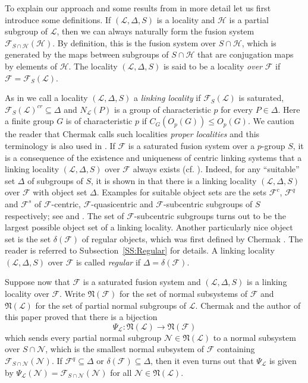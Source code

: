 \documentclass[reqno,11pt]{amsart}
\numberwithin{equation}{section}
\theoremstyle{definition}
\newcommand{\F}{\mathcal{F}}
\renewcommand{\L}{\mathcal{L}}
\newcommand{\N}{\mathcal{N}}
\renewcommand{\H}{\mathcal{H}}
\newcommand{\fN}{\mathfrak{N}}
\begin{document}
\smallskip

To explain our approach and some results from \cite{Chermak/Henke} in more detail let us first introduce some definitions. If $(\L,\Delta,S)$ is a locality and $\H$ is a partial subgroup of $\L$, then we can always naturally form the fusion system $\F_{S\cap\H}(\H)$. By definition, this is the fusion system over $S\cap\H$, which is generated by the maps between subgroups of $S\cap\H$ that are conjugation maps by elements of $\H$. The locality $(\L,\Delta,S)$ is said to be a locality \emph{over} $\F$ if $\F=\F_S(\L)$. 

\smallskip

As in \cite{Henke:2015} we call a locality $(\L,\Delta,S)$  a \emph{linking locality} if $\F_S(\L)$ is saturated, $\F_S(\L)^{cr}\subseteq\Delta$ and $N_\L(P)$ is a group of characteristic $p$ for every $P\in\Delta$. Here a finite group $G$ is of characteristic $p$ if $C_G(O_p(G))\leq O_p(G)$. We caution the reader that Chermak \cite{ChermakII,ChermakIII} calls such localities \emph{proper localities} and this terminology is also used in \cite{Chermak/Henke}. If $\F$ is a saturated fusion system over a $p$-group $S$, it is a consequence of the existence and uniqueness of centric linking systems that a linking locality $(\L,\Delta,S)$ over $\F$ always exists (cf. \cite{Chermak:2013,Oliver:2013,Glauberman/Lynd}). Indeed, for any ``suitable'' set $\Delta$  of subgroups of $S$, it is shown in \cite[Theorem~A]{Henke:2015} that there is a linking locality $(\L,\Delta,S)$ over $\F$ with object set $\Delta$. Examples for suitable object sets are the sets $\F^c$, $\F^q$ and $\F^s$ of $\F$-centric, $\F$-quasicentric and $\F$-subcentric subgroups of $S$ respectively; see \cite[Definition~I.3.1, Definition~III.4.5]{Aschbacher/Kessar/Oliver:2011} and \cite[Definition~1]{Henke:2015}. The set of $\F$-subcentric subgroups turns out to be the largest possible object set of a linking locality. Another particularly nice object set is the set $\delta(\F)$ of regular objects, which was first defined by Chermak \cite[p.36]{ChermakIII}. The reader is referred to Subsection~\ref{SS:Regular} for details. A linking locality $(\L,\Delta,S)$ over $\F$ is called \emph{regular} if $\Delta=\delta(\F)$.

\smallskip

Suppose now that $\F$ is a saturated fusion system and $(\L,\Delta,S)$ is a linking locality over $\F$. Write $\fN(\F)$ for the set of normal subsystems of $\F$ and $\fN(\L)$ for the set of partial normal subgroups of $\L$. Chermak and the author of this paper \cite[Theorem~A]{Chermak/Henke} proved that there is a bijection
\[\Psi_\L\colon\fN(\L)\rightarrow \fN(\F)\]
which sends every partial normal subgroup $\N\in\fN(\L)$ to a normal subsystem over $S\cap \N$, which is the smallest normal subsystem of $\F$ containing $\F_{S\cap\N}(\N)$. If $\F^q\subseteq\Delta$ or $\delta(\F)\subseteq \Delta$, then it even turns out that $\Psi_\L$ is given by $\Psi_\L(\N)=\F_{S\cap\N}(\N)$ for all $\N\in\fN(\L)$.
\end{document}
